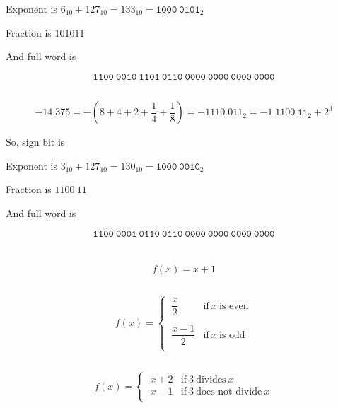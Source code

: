\documentclass[10pt]{article} %
\begin{document}
Exponent is $6_{10} + 127_{10} = 133_{10} = \mathtt{1000 \ 0101}_2$

Fraction is $10 1011$

And full word is

\[\mathtt{1100 \ 0010 \ 1101 \ 0110 \ 0000 \ 0000 \ 0000 \ 0000}\]
\subsection{}
\[-14.375 = -\left(8 + 4 + 2 + \frac{1}{4} + \frac{1}{8}\right) = -\mathtt{1110.011}_2 = -\mathtt{1.1100 \ 11}_2+2^3\]

So, sign bit is {}

Exponent is $3_{10} + 127_{10} = 130_{10} = \mathtt{1000 \ 0010}_2$

Fraction is $1100 \ 11$

And full word is

\[\mathtt{1100 \ 0001 \ 0110 \ 0110 \ 0000 \ 0000 \ 0000 \ 0000}\]

\section{}
\subsection{}
\[ f(x) = x+1 \]
\subsection{}
\[
  f(x) =
  \begin{cases} 
   \ \dfrac{x}{2} & \text{if} \ x \ \text{is even} \\
   \\
   \ \dfrac{x-1}{2} & \text{if} \ x \ \text{is odd} \\
  \end{cases}
\]
\subsection{}
\[
  f(x) =
  \begin{cases} 
   \ x + 2 & \text{if} \ 3 \ \text{divides} \ x \\
   \ x - 1 & \text{if} \ 3 \ \text{does not divide} \ x \\
  \end{cases}
\]
\section{}
\end{document}
